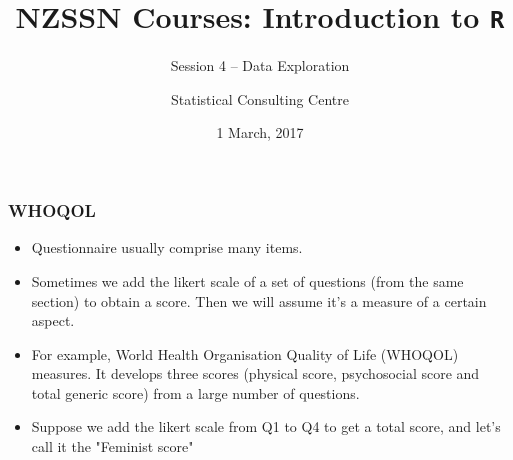 \documentclass{beamer}\usepackage[]{graphicx}\usepackage[]{color}
\author[SCC]{Statistical Consulting Centre}%
\institute[\href{mailto:consulting@stat.auckland.ac.nz}
  {consulting@stat.auckland.ac.nz}]{\href{mailto:consulting@stat.auckland.ac.nz}
  {consulting@stat.auckland.ac.nz}\\
The Department of Statistics\\
The University of Auckland}
\title[Session 4 -- Data Exploration]{NZSSN Courses: Introduction to \texttt{R}}
\subtitle{Session 4 -- Data Exploration}
\date{1 March, 2017}
\begin{document}
\maketitle

\begin{frame}[fragile]
  \frametitle{WHOQOL}

\begin{itemize}
\item Questionnaire usually comprise many items.
\item Sometimes we add the likert scale of a set of questions (from the same section) to obtain a score. Then we will assume it's a measure of a certain aspect.
\item For example, World Health Organisation Quality of Life (WHOQOL) measures. It develops three scores (physical score, psychosocial score and total generic score) from a large number of questions.
\item Suppose we add the likert scale from Q1 to Q4 to get a total score, and let's call it the "Feminist score"
\end{itemize}
\end{frame}
\end{document}
